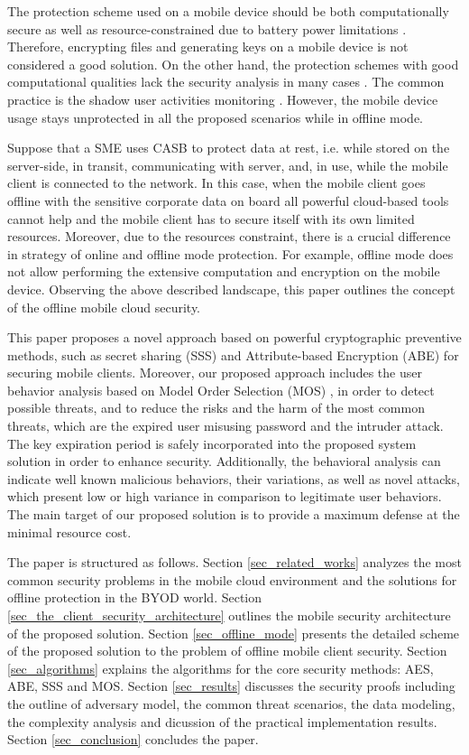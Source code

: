 \documentclass[twocolumn]{svjour3}          	%
\begin{document}
The protection scheme used on a mobile device should be both computationally secure as well as resource-constrained due to battery power limitations \cite{khan2015cloud}. Therefore, encrypting files and generating keys on a mobile device is not considered a good solution. On the other hand, the protection schemes with good computational qualities lack the security analysis in many cases \cite{khan2014bss}. The common practice is the shadow user activities monitoring \cite{yovel2014}. However, the mobile device usage stays unprotected in all the proposed scenarios while in offline mode.

Suppose that a SME uses CASB to protect data at rest, i.e. while stored on the server-side, in transit, communicating with server, and, in use, while the mobile client is connected to the network. In this case, when the mobile client goes offline with the sensitive corporate data on board all powerful cloud-based tools cannot help and the mobile client has to secure itself with its own limited resources. Moreover, due to the resources constraint, there is a crucial difference in strategy of online and offline mode protection. For example, offline mode does not allow performing the extensive computation and encryption on the mobile device.
Observing the above described landscape, this paper outlines the concept of the offline mobile cloud security. 

This paper proposes a novel approach based on powerful cryptographic preventive methods, such as secret sharing (SSS) \cite{galibus2007} and Attribute-based Encryption (ABE) \citep{goyal2006attribute} for securing mobile clients. Moreover, our proposed approach includes the user behavior analysis based on Model Order Selection (MOS) \cite{tenorio2013greatest}, in order to detect possible threats, and to reduce the risks and the harm of the most common threats, which are the expired user misusing password and the intruder attack. The key expiration period is safely incorporated into the proposed system solution in order to enhance security. Additionally, the behavioral analysis can indicate well known malicious behaviors, their variations, as well as novel attacks, which present low or high variance in comparison to legitimate user behaviors. The main target of our proposed solution is to provide a maximum defense at the minimal resource cost.

The paper is structured as follows. Section \ref{sec_related_works} analyzes the most common security problems in the mobile cloud environment and the solutions for offline protection in the BYOD world. Section \ref{sec_the_client_security_architecture} outlines the mobile security architecture of the proposed solution. Section \ref{sec_offline_mode} presents the detailed scheme of the proposed solution to the problem of offline mobile client security. Section \ref{sec_algorithms} explains the algorithms for the core security methods: AES, ABE, SSS and MOS. Section \ref{sec_results} discusses the security proofs including the outline of adversary model, the common threat scenarios, the data modeling, the complexity analysis and dicussion of the practical implementation results. Section \ref{sec_conclusion} concludes the paper.
\end{document}
